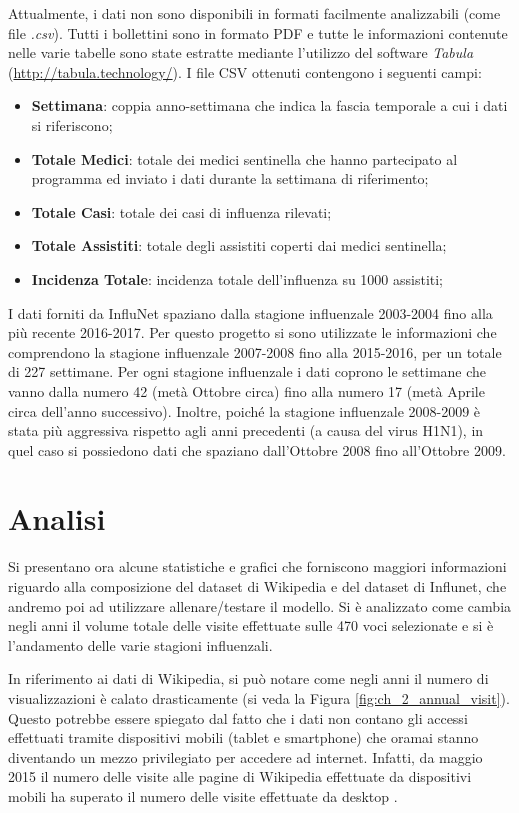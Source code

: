 Attualmente, i dati non sono disponibili in formati facilmente analizzabili (come file \textit{.csv}). Tutti i bollettini
sono in formato PDF e tutte le informazioni contenute nelle varie tabelle sono state estratte mediante l'utilizzo del software \textit{Tabula} (\url{http://tabula.technology/}). I file CSV ottenuti contengono i seguenti campi:
\begin{itemize}[noitemsep]
\item \textbf{Settimana}: coppia anno-settimana che indica la fascia temporale a cui i dati si riferiscono;
\item \textbf{Totale Medici}: totale dei medici sentinella che hanno partecipato al programma ed inviato i dati durante la settimana di riferimento; 
\item \textbf{Totale Casi}: totale dei casi di influenza rilevati;
\item \textbf{Totale Assistiti}: totale degli assistiti coperti dai medici sentinella;
\item \textbf{Incidenza Totale}: incidenza totale dell'influenza su 1000 assistiti;
\end{itemize}
\bigskip

I dati forniti da InfluNet spaziano dalla stagione influenzale 2003-2004 fino alla più recente 2016-2017. Per questo progetto 
si sono utilizzate le informazioni che comprendono la stagione influenzale 2007-2008 fino alla 2015-2016, per un totale di 
227 settimane. Per ogni stagione influenzale i dati coprono le settimane che vanno dalla numero 42 (metà Ottobre circa) fino 
alla numero 17 (metà Aprile circa dell'anno successivo). Inoltre, poiché la stagione influenzale 2008-2009 è stata più 
aggressiva rispetto agli anni precedenti (a causa del virus H1N1), in quel caso si possiedono dati che spaziano dall'Ottobre 
2008 fino all'Ottobre 2009.

\section{Analisi}
\bigskip

Si presentano ora alcune statistiche e grafici che forniscono maggiori informazioni riguardo alla composizione del dataset di 
Wikipedia e del dataset di Influnet, che andremo poi ad utilizzare allenare/testare il modello. Si è analizzato come 
cambia negli anni il volume totale delle visite effettuate sulle 470 voci selezionate e si è 
l'andamento delle varie stagioni influenzali.
\bigskip

In riferimento ai dati di Wikipedia, si può notare come negli anni il numero di visualizzazioni è calato drasticamente (si 
veda la Figura \ref{fig:ch_2_annual_visit}). Questo potrebbe essere spiegato dal fatto che i dati non contano gli accessi 
effettuati tramite dispositivi mobili (tablet e smartphone) che oramai stanno diventando un mezzo privilegiato per accedere 
ad internet. Infatti, da maggio 2015 il numero delle visite alle pagine di Wikipedia effettuate da dispositivi mobili ha 
superato il numero delle visite effettuate da desktop \cite{wikipedia_mobile_desktop}.
\bigskip


